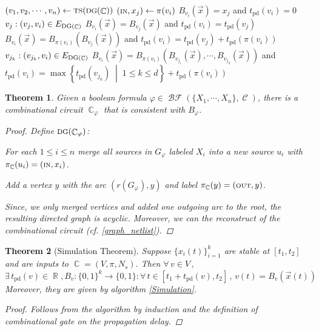 \documentclass[12pt]{article}
\newcommand{\set}[2]{\left\{{#1}\;\middle|\;{#2}\right\}}
\newcommand{\Forall}[1]{\forall\,{#1}\,,\,}
\newcommand{\Exist}[1]{\exists\,{#1}:}
\newcommand{\scr}[1]{{\scriptstyle\textup{#1}}}
\newcommand{\scrf}[1]{{\scriptstyle\textup{\footnotesize #1}}}
\DeclareMathOperator{\R}{\mathbb{R}}
\DeclareMathOperator{\C}{\mathcal{C}}
\DeclareMathOperator{\Circ}{\mathbb{C}}
\DeclareMathOperator{\BF}{\mathcal{BF}}
\newcommand*{\B}{\{0,1\}}
\newcommand*{\degin}{\deg_{\text{in}}}
\newtheorem{theorem}{Theorem}[subsection]
\begin{document}
\begin{algorithm}[H]
  \caption{Simulation, for $\Circ=(V,\pi,N_s)$ with input $\vec{x}$}
  \begin{algorithmic}
    \State $(v_1,v_2,\cdots,v_n)\gets\scrf{TS}(\scrf{DG}(\Circ))$
      \If{$\degin(v_i)=0$}
        \State $(\scr{IN},x_j)\gets \pi(v_i)$
        \State\Return $B_{v_i}(\vec{x})=x_j$ and $t_\text{pd}(v_i)=0$
      \ElsIf{$\degin(v_i)=1$}
        \State $v_j: (v_j,v_i)\in E_{\scr{DG}(\Circ)}$
        \If{$\pi(v_i)=(\scr{OUT},y)$}
          \State\Return $B_{v_i}(\vec{x})=B_{v_j}(\vec{x})$ and $t_\text{pd}(v_i)=t_\text{pd}(v_j)$
        \Else{}
        \State\Return $B_{v_i}(\vec{x})=B_{\pi(v_i)}(B_{v_j}(\vec{x}))$ and $t_\text{pd}(v_i)=t_\text{pd}(v_j)+t_\text{pd}(\pi(v_i))$
        \EndIf
      \Else{$\;d=\degin(v_i)\geq 2$}
        \State $v_{j_k}: (v_{j_k},v_i)\in E_{\scr{DG}(\Circ)}$
        \State\Return $B_{v_i}(\vec{x})=B_{\pi(v_i)}(B_{v_{j_1}}(\vec{x}),\cdots,B_{v_{j_d}}(\vec{x}))$
        \State and $t_\text{pd}(v_i)=\max\set{t_\text{pd}(v_{j_k})}{1\leq k\leq d}+t_\text{pd}(\pi(v_i))$
      \EndIf
    \EndFor
  \end{algorithmic}
  \label{Simulation}
\end{algorithm}

\begin{theorem}
  Given a boolean formula $\varphi\in\BF(\{X_1,\cdots,X_n\},\C)$, there is a combinational circuit $\Circ_\varphi$ that is consistent with $B_\varphi$.
  \begin{proof}
    Define $\scrf{DG}(\Circ_\varphi)$:
    \begin{compactitem}
      \item For each $1\leq i\leq n$ merge all sources in $G_\varphi$ labeled $X_i$ into a new source $u_i$ with $\pi_{\Circ}(u_i)=(\scr{IN},x_i)$.
      \item Add a vertex $y$ with the arc $(r(G_\varphi),y)$ and label $\pi_{\Circ}(y)=(\scr{OUT},y)$.
    \end{compactitem}
    Since, we only merged vertices and added one outgoing arc to the root, the resulting directed graph is acyclic. Moreover, we can the reconstruct of the combinational circuit (cf. \ref{graph_netlist}).
  \end{proof}
\end{theorem}

\begin{theorem}[Simulation Theorem]
  Suppose $\{x_i(t)\}_{i=1}^k$ are stable at $[t_1,t_2]$ and are inputs to $\Circ=(V,\pi,N_s)$. Then $\Forall{v\in V}$$$\Exist{t_\text{pd}(v)\in\R, B_v:\B^k\to\B}\Forall{t\in[t_1+t_\text{pd}(v),t_2]} v(t)=B_v(\vec{x}(t))$$ Moreover, they are given by algorithm \ref{Simulation}.
  \begin{proof}
    Follows from the algorithm by induction and the definition of combinational gate on the propagation delay.
  \end{proof}
\end{theorem}
\end{document}
